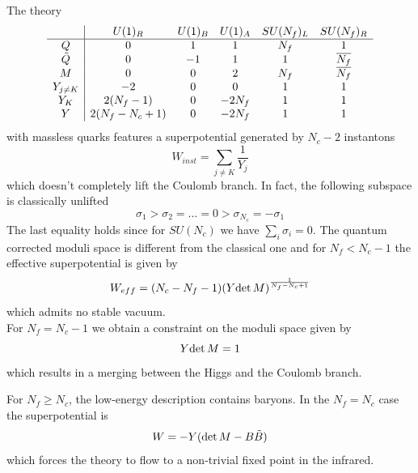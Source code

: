 The theory \begin{equation}
\begin{array}{ c | c c c c c}
  & U(1)_R & U(1)_B & U(1)_A & SU(N_f)_L & SU(N_f)_R \\
 \hline
 Q & 0 &1 & 1 & N_f & 1 \\  
 \tilde{Q}& 0 &-1 & 1 &1 & \overline{N_f}  \\  
   M & 0 & 0 & 2 & N_f & \overline{N_f}\\  
   Y_{j \neq K} & -2 & 0  & 0 &  1 & 1 \\
   Y_{K} & 2 (N_f -1 ) & 0 & - 2 N_f & 1 & 1 \\
   Y & 2 ( N_f -N_c +1) & 0 & - 2 N_f & 1 & 1 \\
\end{array}
\end{equation}
with massless quarks features a superpotential generated by $N_c - 2$ instantons 
\begin{equation}
W_{inst} = \sum_{j \neq K} \frac{1}{Y_j}
\end{equation}
which doesn't completely lift the Coulomb branch.
In fact, the following subspace is classically unlifted
\begin{equation}
 \sigma_1 > \sigma_2 = \dots = 0 > \sigma_{N_c} = - \sigma_1
\end{equation}
The last equality holds since for $SU(N_c)$ we have $\sum_i \sigma_i = 0$.
The quantum corrected moduli space is different from the classical one and for $N_f < N_c -1 $ the effective superpotential is given by
\begin{equation}
 W_{eff} = (N_c - N_f - 1) ( Y \mathrm{det } \,{M} ) ^{\frac{1}{N_f - N_c +1}}
\end{equation}
which admits no stable vacuum.\\
For $N_f = N_c - 1 $ we obtain a constraint on the moduli space given by 
\begin{equation}
Y \mathrm{det } \, M = 1
\end{equation}
which results in a merging between the Higgs and the Coulomb branch.

For $N_f \geq N_c $, the low-energy description contains baryons.
In the $N_f = N_c$ case the superpotential is 
\begin{equation}
W = - Y ( \mathrm{det } \,{M} - B \tilde{B})
\label{eqn:3d_sun_nf__n_c_superpot}
\end{equation}
which forces the theory to flow to a non-trivial fixed point in the infrared.


